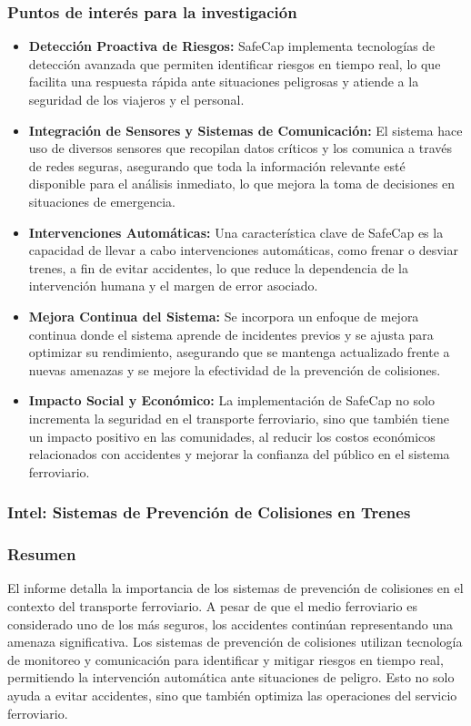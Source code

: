 \documentclass[journal]{IEEEtran}
\begin{document}
\subsubsection*{Puntos de interés para la investigación}
\begin{itemize}
    \item \textbf{Detección Proactiva de Riesgos:}
    SafeCap implementa tecnologías de detección avanzada que permiten identificar riesgos en tiempo real, lo que facilita una respuesta rápida ante situaciones peligrosas y atiende a la seguridad de los viajeros y el personal\cite{ada2014safecap}.
    \item \textbf{Integración de Sensores y Sistemas de Comunicación:}
    El sistema hace uso de diversos sensores que recopilan datos críticos y los comunica a través de redes seguras, asegurando que toda la información relevante esté disponible para el análisis inmediato, lo que mejora la toma de decisiones en situaciones de emergencia\cite{ada2014safecap}.
    \item \textbf{Intervenciones Automáticas:}
    Una característica clave de SafeCap es la capacidad de llevar a cabo intervenciones automáticas, como frenar o desviar trenes, a fin de evitar accidentes, lo que reduce la dependencia de la intervención humana y el margen de error asociado\cite{ada2014safecap}.
    \item \textbf{Mejora Continua del Sistema:}
    Se incorpora un enfoque de mejora continua donde el sistema aprende de incidentes previos y se ajusta para optimizar su rendimiento, asegurando que se mantenga actualizado frente a nuevas amenazas y se mejore la efectividad de la prevención de colisiones\cite{ada2014safecap}.
    \item \textbf{Impacto Social y Económico:}
    La implementación de SafeCap no solo incrementa la seguridad en el transporte ferroviario, sino que también tiene un impacto positivo en las comunidades, al reducir los costos económicos relacionados con accidentes y mejorar la confianza del público en el sistema ferroviario\cite{ada2014safecap}.
\end{itemize}

\subsubsection{Intel: Sistemas de Prevención de Colisiones en Trenes}
\subsubsection*{Resumen}
El informe detalla la importancia de los sistemas de prevención de colisiones en el contexto del transporte ferroviario. A pesar de que el medio ferroviario es considerado uno de los más seguros, los accidentes continúan representando una amenaza significativa. Los sistemas de prevención de colisiones utilizan tecnología de monitoreo y comunicación para identificar y mitigar riesgos en tiempo real, permitiendo la intervención automática ante situaciones de peligro. Esto no solo ayuda a evitar accidentes, sino que también optimiza las operaciones del servicio ferroviario.
\end{document}
